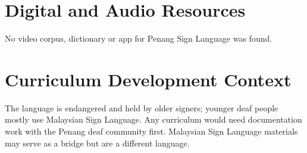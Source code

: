 \documentclass[12pt]{article}
\begin{document}
\section{Digital and Audio Resources}
No video corpus, dictionary or app for Penang Sign Language was found.

\section{Curriculum Development Context}
The language is endangered and held by older signers; younger deaf people mostly use Malaysian Sign Language. Any curriculum would need documentation work with the Penang deaf community first. Malaysian Sign Language materials may serve as a bridge but are a different language.
\end{document}
